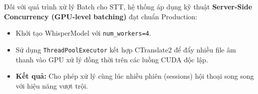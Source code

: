 \documentclass[12pt,a4paper]{article}
\begin{document}
Đối với quá trình xử lý Batch cho STT, hệ thống áp dụng kỹ thuật \textbf{Server-Side Concurrency (GPU-level batching)} đạt chuẩn Production:
\begin{itemize}[noitemsep]
    \item Khởi tạo WhisperModel với \texttt{num\_workers=4}.
    \item Sử dụng \texttt{ThreadPoolExecutor} kết hợp CTranslate2 để đẩy nhiều file âm thanh vào GPU xử lý đồng thời trên các luồng CUDA độc lập.
    \item \textbf{Kết quả:} Cho phép xử lý cùng lúc nhiều phiên (sessions) hội thoại song song với hiệu năng vượt trội.
\end{itemize}
\end{document}
